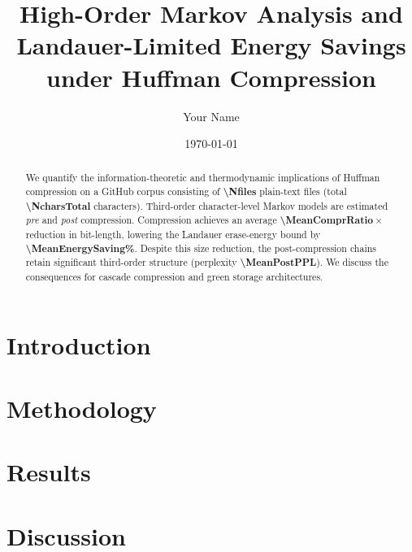 \documentclass[11pt]{article}
\title{High-Order Markov Analysis and Landauer-Limited Energy Savings\\
       under Huffman Compression}
\author{Your Name}
\date{\today}
\begin{document}
\maketitle
\begin{abstract}
We quantify the information-theoretic and thermodynamic implications of
Huffman compression on a GitHub corpus consisting of \textbf{\num{\Nfiles}}
plain-text files (total \textbf{\num{\NcharsTotal}} characters).
Third-order character-level Markov models are estimated \emph{pre} and
\emph{post} compression.  Compression achieves an average
\textbf{\num[round-precision=2]{\MeanComprRatio}} × reduction in bit-length,
lowering the Landauer erase-energy bound by
\textbf{\num{\MeanEnergySaving}\%}.  Despite this size reduction, the
post-compression chains retain significant third-order structure
(perplexity \textbf{\num{\MeanPostPPL}}).  We discuss the consequences for
cascade compression and green storage architectures.
\end{abstract}

\section{Introduction}


\section{Methodology}


\section{Results}


\section{Discussion}


\printbibliography
\end{document}

